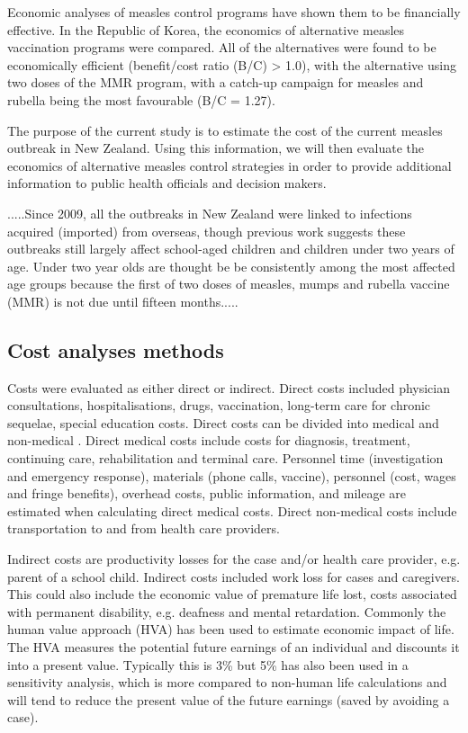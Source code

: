 \documentclass{article}
\begin{document}
Economic analyses of measles control programs have shown them to be financially effective. In the Republic of Korea, the economics of alternative measles vaccination programs were compared. All of the alternatives were found to be economically efficient (benefit/cost ratio (B/C) > 1.0), with the alternative using two doses of the MMR program, with a catch-up campaign for measles and rubella being the most favourable (B/C = 1.27).

The purpose of the current study is to estimate the cost of the current measles outbreak in New Zealand. Using this information, we will then evaluate the economics of alternative measles control strategies in order to provide additional information to public health officials and decision makers.

.....Since 2009, all the outbreaks in New Zealand were linked to infections acquired (imported) from overseas, though previous work suggests these outbreaks still largely affect school-aged children and children under two years of age. Under two year olds are thought be be consistently among the most affected age groups because the first of two doses of measles, mumps and rubella vaccine (MMR) is not due until fifteen months.....

\subsection{Cost analyses methods}
Costs were evaluated as either direct or indirect. Direct costs included physician consultations, hospitalisations, drugs, vaccination, long-term care for chronic sequelae, special education costs. Direct costs can be divided into medical and non-medical \citep{saha13}. Direct medical costs include costs for diagnosis, treatment, continuing care, rehabilitation and terminal care. Personnel time (investigation and emergency response), materials (phone calls, vaccine), personnel (cost, wages and fringe benefits), overhead costs, public information, and mileage are estimated when calculating direct medical costs. Direct non-medical costs include transportation to and from health care providers.

Indirect costs are productivity losses for the case and/or health care provider, e.g. parent of a school child. Indirect costs included work loss for cases and caregivers. This could also include the economic value of premature life lost, costs associated with permanent disability, e.g. deafness and mental retardation. Commonly the human value approach (HVA) has been used to estimate economic impact of life. The HVA measures the potential future earnings of an individual and discounts it into a present value. Typically this is 3\% but 5\% has also been used in a sensitivity analysis, which is more compared to non-human life calculations and will tend to reduce the present value of the future earnings (saved by avoiding a case).
\end{document}
